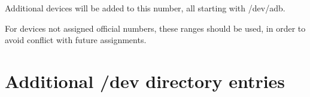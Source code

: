 \noindent
Additional devices will be added to this number, all starting with
{\file /dev/adb}.

\begin{devicelist}
	\minordots
\end{devicelist}

\begin{devicelist}
	\minordots
\end{devicelist}

\begin{devicelist}
\end{devicelist}

\begin{devicelist}
\end{devicelist}

\noindent
For devices not assigned official numbers, these ranges should be
used, in order to avoid conflict with future assignments.

\begin{devicelist}
\end{devicelist}

\begin{devicelist}
\end{devicelist}

\begin{devicelist}
\end{devicelist}

\begin{devicelist}
\end{devicelist}

\begin{devicelist}
\end{devicelist}

\section{Additional /dev directory entries}

